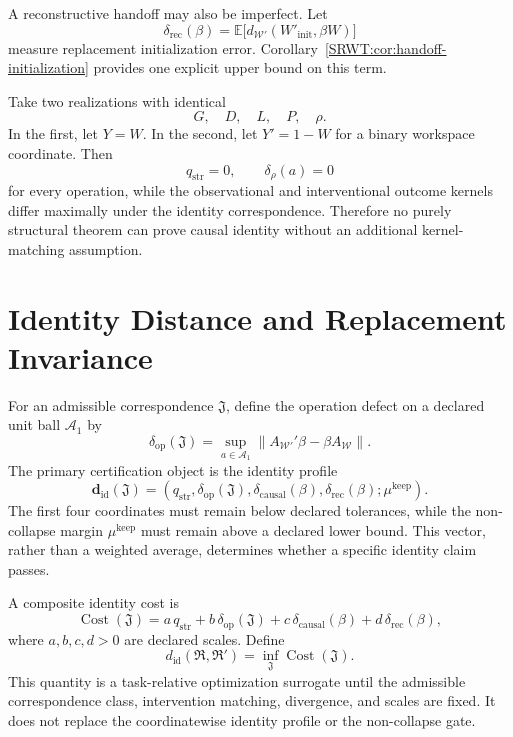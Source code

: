 A reconstructive handoff may also be imperfect. Let
\[
\delta_{\mathrm{rec}}(\beta)
=
\mathbb E\bigl[d_{\mathcal W'}(W'_{\mathrm{init}},\beta W)\bigr]
\]
measure replacement initialization error. Corollary~\ref{SRWT:cor:handoff-initialization}
provides one explicit upper bound on this term.


Take two realizations with identical
\[
G,
\quad D,
\quad L,
\quad P,
\quad \rho.
\]
In the first, let \(Y=W\). In the second, let \(Y'=1-W\) for a binary
workspace coordinate. Then
\[
q_{\mathrm{str}}=0,
\qquad
\delta_\rho(a)=0
\]
for every operation, while the observational and interventional outcome
kernels differ maximally under the identity correspondence. Therefore no
purely structural theorem can prove causal identity without an additional
kernel-matching assumption.

\section{Identity Distance and Replacement Invariance}

For an admissible correspondence \(\mathfrak J\), define the operation defect
on a declared unit ball \(\mathcal A_1\) by
\[
\delta_{\mathrm{op}}(\mathfrak J)
=
\sup_{a\in\mathcal A_1}
\|A_{\mathcal W'}'\beta-\beta A_{\mathcal W}\|.
\]
The primary certification object is the identity profile
\[
\boxed{
\mathbf d_{\mathrm{id}}(\mathfrak J)
=
\left(
q_{\mathrm{str}},
\delta_{\mathrm{op}}(\mathfrak J),
\delta_{\mathrm{causal}}(\beta),
\delta_{\mathrm{rec}}(\beta);
\mu^{\mathrm{keep}}
\right).
}
\]
The first four coordinates must remain below declared tolerances, while the
non-collapse margin \(\mu^{\mathrm{keep}}\) must remain above a declared lower
bound. This vector, rather than a weighted average, determines whether a
specific identity claim passes.

A composite identity cost is
\[
\boxed{
\operatorname{Cost}(\mathfrak J)
=
a\,q_{\mathrm{str}}
+b\,\delta_{\mathrm{op}}(\mathfrak J)
+c\,\delta_{\mathrm{causal}}(\beta)
+d\,\delta_{\mathrm{rec}}(\beta),
}
\]
where \(a,b,c,d>0\) are declared scales. Define
\[
\boxed{
d_{\mathrm{id}}(\mathfrak R,\mathfrak R')
=
\inf_{\mathfrak J}
\operatorname{Cost}(\mathfrak J).
}
\]
This quantity is a task-relative optimization surrogate until the
admissible correspondence class, intervention matching, divergence, and scales
are fixed. It does not replace the coordinatewise identity profile or the
non-collapse gate.


